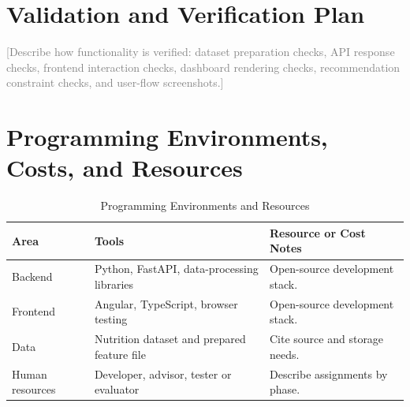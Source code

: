 \documentclass[12pt]{report}
\newcommand{\placeholder}[1]{\textcolor{gray}{[#1]}}
\begin{document}
\section{Validation and Verification Plan}
\placeholder{Describe how functionality is verified: dataset preparation checks, API response checks, frontend interaction checks, dashboard rendering checks, recommendation constraint checks, and user-flow screenshots.}

\section{Programming Environments, Costs, and Resources}
\begin{table}[H]
    \centering
    \caption{Programming Environments and Resources}
    \begin{tabular}{p{} p{} p{}}
        \toprule
        Area & Tools & Resource or Cost Notes \\
        \midrule
        Backend & Python, FastAPI, data-processing libraries & Open-source development stack. \\
        Frontend & Angular, TypeScript, browser testing & Open-source development stack. \\
        Data & Nutrition dataset and prepared feature file & Cite source and storage needs. \\
        Human resources & Developer, advisor, tester or evaluator & Describe assignments by phase. \\
        \bottomrule
    \end{tabular}
\end{table}
\end{document}
